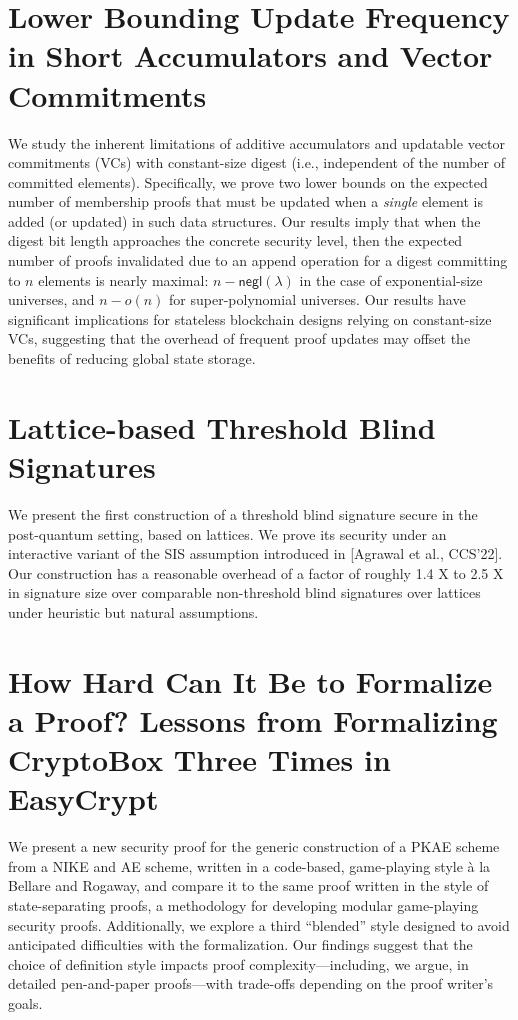 \documentclass[11pt]{article}
\theoremstyle{definition}
\theoremstyle{remark}
\theoremstyle{plain}
\begin{document}
\section{\cite{cryptoeprint:2025/1558} Lower Bounding Update Frequency in Short Accumulators and Vector Commitments}
We study the inherent limitations of additive accumulators and updatable vector commitments (VCs) with constant-size digest (i.e., independent of the number of committed elements). Specifically, we prove two lower bounds on the expected number of membership proofs that must be updated when a \emph{single} element is added (or updated) in such data structures. Our results imply that when the digest bit length approaches the concrete security level, then the expected number of proofs invalidated due to an append operation for a digest committing to $n$ elements is nearly maximal: $n-\mathsf{negl}(\lambda)$ in the case of exponential-size universes, and $n-o(n)$ for super-polynomial universes. Our results have significant implications for stateless blockchain designs relying on constant-size VCs, suggesting that the overhead of frequent proof updates may offset the benefits of reducing global state storage.
\section{\cite{cryptoeprint:2025/1566} Lattice-based Threshold Blind Signatures}
We present the first construction of a threshold blind signature secure in the post-quantum setting, based on lattices. We prove its security under an interactive variant of the SIS assumption introduced in [Agrawal et al., CCS’22]. Our construction has a reasonable overhead of a factor of roughly 1.4 X to 2.5 X in signature size over comparable non-threshold blind signatures over lattices under heuristic but natural assumptions.
\section{\cite{cryptoeprint:2025/1569} How Hard Can It Be to Formalize a Proof? Lessons from Formalizing CryptoBox Three Times in EasyCrypt}
We present a new security proof for the generic construction of a PKAE scheme from a NIKE and AE scheme, written in a code-based, game-playing style à la Bellare and Rogaway, and compare it to the same proof written in the style of state-separating proofs, a methodology for developing modular game-playing security proofs. Additionally, we explore a third “blended” style designed to avoid anticipated difficulties with the formalization. Our findings suggest that the choice of definition style impacts proof complexity—including, we argue, in detailed pen-and-paper proofs—with trade-offs depending on the proof writer’s goals.
\end{document}
